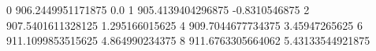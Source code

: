0 906.2449951171875 0.0
1 905.4139404296875 -0.8310546875
2 907.5401611328125 1.295166015625
4 909.7044677734375 3.45947265625
6 911.1099853515625 4.864990234375
8 911.6763305664062 5.43133544921875
